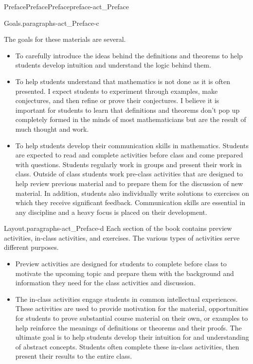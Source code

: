 \documentclass[oneside,10pt,]{book}
\numberwithin{equation}{chapter}
\begin{document}
\begin{preface}{Preface}{Preface}{}{Preface}{}{}{preface-act_Preface}
\begin{paragraphs}{Goals.}{paragraphs-act_Preface-c}
\par
The goals for these materials are several.%
\begin{itemize}[label=\textbullet]
\item{}To carefully introduce the ideas behind the definitions and theorems to help students develop intuition and understand the logic behind them.%
\item{}To help students understand that mathematics is not done as it is often presented. I expect students to experiment through examples, make conjectures, and then refine or prove their conjectures. I believe it is important for students to learn that definitions and theorems don't pop up completely formed in the minds of most mathematicians but are the result of much thought and work.%
\item{}To help students develop their communication skills in mathematics. Students are expected to read and complete activities before class and come prepared with questions. Students regularly work in groups and present their work in class. Outside of class students work pre-class activities that are designed to help review previous material and to prepare them for the discussion of new material. In addition, students also individually write solutions to exercises on which they receive significant feedback. Communication skills are essential in any discipline and a heavy focus is placed on their development.%
\end{itemize}
%
\end{paragraphs}%
\begin{paragraphs}{Layout.}{paragraphs-act_Preface-d}%
Each section of the book contains preview activities, in-class activities, and exercises. The various types of activities serve different purposes.%
\begin{itemize}[label=\textbullet]
\item{}Preview activities are designed for students to complete before class to motivate the upcoming topic and prepare them with the background and information they need for the class activities and discussion.%
\item{}The in-class activities engage students in common intellectual experiences. These activities are used to provide motivation for the material, opportunities for students to prove substantial course material on their own, or examples to help reinforce the meanings of definitions or theorems and their proofs. The ultimate goal is to help students develop their intuition for and understanding of abstract concepts. Students often complete these in-class activities, then present their results to the entire class.%

\end{itemize}
\end{paragraphs}
\end{preface}
\end{document}
